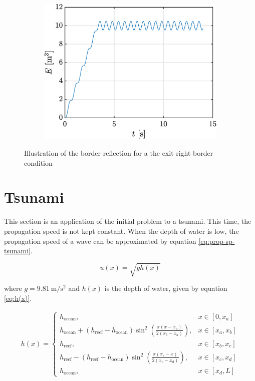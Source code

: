\documentclass[a4paper,12pt,twoside]{article}
\newcommand{\bracket}[1]{\left(#1\right)}
\newcommand{\sqbracket}[1]{\left[#1\right]}
\begin{document}
\begin{figure}[h!]
    \centering
    \begin{subfigure}{0.5\textwidth}
    \includegraphics[width=\textwidth]{graphs/ex1Esortie.eps}
    \end{subfigure}

    \caption{Illustration of the border reflection for a the exit right border condition}
    \label{fig:ex1sor}
    \end{figure}

    \section{Tsunami}
      This section is an application of the initial problem to a tsunami.
      This time, the propagation speed is not kept constant.
      When the depth of water is low, the propagation speed of a wave can be approximated by equation \eqref{eq:prop-sp-tsunami}.

      \begin{equation}
        u\bracket{x} = \sqrt{gh\bracket{x}}
        \label{eq:prop-sp-tsunami}
      \end{equation}

      where $g=\SI{9.81}{\meter\per\square\second}$ and $h\bracket{x}$ is the depth of water, given by equation \eqref{eq:h(x)}.

      \begin{align}
        h(x)=
        \begin{cases}
          h_\text{ocean}, &x\in\sqbracket{0,x_a} \\
          h_\text{ocean} + \bracket{h_\text{reef} - h_\text{ocean}}\sin^2\bracket{\frac{\pi\bracket{x-x_a}}{2\bracket{x_b-x_a}}}, &x\in\sqbracket{x_a,x_b} \\
          h_\text{reef}, &x\in\sqbracket{x_b,x_c} \\
          h_\text{reef} - \bracket{h_\text{reef} - h_\text{ocean}}\sin^2\bracket{\frac{\pi\bracket{x_c - x}}{2\bracket{x_c-x_d}}}, &x\in\sqbracket{x_c,x_d} \\
          h_\text{ocean}, &x\in\sqbracket{x_d, L}
        \end{cases}
        \label{eq:h(x)}
      \end{align}
\end{document}
